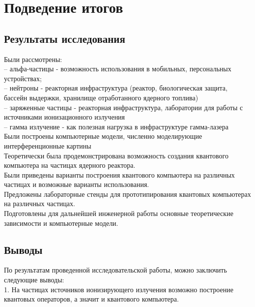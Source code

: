 \documentclass[11pt]{report}
\begin{document}
\chapter{Подведение итогов}

\section{Результаты исследования}
Были рассмотрены:\\

-- альфа-частицы - возможность использования в мобильных, персональных устройствах;\\

-- нейтроны - реакторная инфраструктура (реактор, биологическая защита, бассейн выдержки, хранилище отработанного ядерного топлива) \\

-- заряженные частицы - реакторная инфраструктура, лаборатории для работы с источниками ионизационного излучения\\

-- гамма излучение - как полезная нагрузка в инфраструктуре гамма-лазера \\

Были построены компьютерные модели, численно моделирующие интерференционные картины \\

Теоретически была продемонстрирована возможность создания квантового компьютера на частицах ядерного реактора. \\

Были приведены варианты построения квантового компьютера на различных частицах и возможные варианты использования. \\

Предложены лабораторные стенды для прототипирования квантовых компьютерах на различных частицах. \\

Подготовлены для дальнейшей инженерной работы основные теоретические зависимости и компьютерные модели.

\section{Выводы}
По результатам проведенной исследовательской работы, можно заключить следующие выводы: \\

1. На частицах источников ионизирующего излучения возможно построение квантовых операторов, а значит и квантового компьютера.\\
\end{document}
